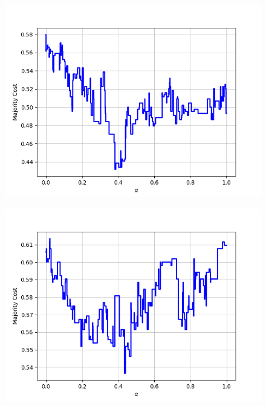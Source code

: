 \begin{figure}[h]
\begin{minipage}{.19\textwidth}
  {\includegraphics[width=\linewidth]{plots/omniglot-intra-ac-cnn/Cyrillic}}
\end{minipage}
\begin{minipage}{.19\textwidth}
  \centering
  {\includegraphics[width=\linewidth]{plots/omniglot-intra-ac-cnn/Early_Aramaic}}
\end{minipage}
\begin{minipage}{.19\textwidth}
  \centering

\end{minipage}
\end{figure}

